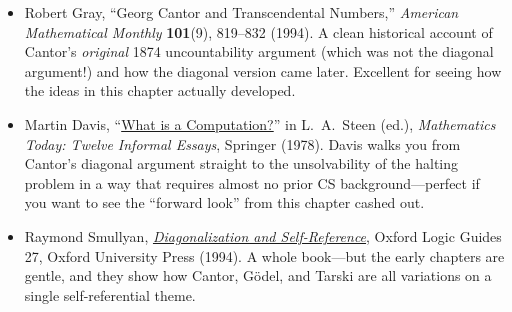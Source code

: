 \documentclass[11pt]{article}
\begin{document}
\begin{itemize}
  \item Robert Gray, ``Georg Cantor and Transcendental Numbers,'' \emph{American Mathematical Monthly} \textbf{101}(9), 819--832 (1994). A clean historical account of Cantor's \emph{original} 1874 uncountability argument (which was not the diagonal argument!) and how the diagonal version came later. Excellent for seeing how the ideas in this chapter actually developed.
  \item Martin Davis, ``\href{https://archive.org/details/mathematicstoday00stee}{What is a Computation?}'' in L.~A.~Steen (ed.), \emph{Mathematics Today: Twelve Informal Essays}, Springer (1978). Davis walks you from Cantor's diagonal argument straight to the unsolvability of the halting problem in a way that requires almost no prior CS background---perfect if you want to see the ``forward look'' from this chapter cashed out.
  \item Raymond Smullyan, \emph{\href{https://academic.oup.com/book/54024}{Diagonalization and Self-Reference}}, Oxford Logic Guides 27, Oxford University Press (1994). A whole book---but the early chapters are gentle, and they show how Cantor, G\"odel, and Tarski are all variations on a single self-referential theme.
\end{itemize}
\end{document}
